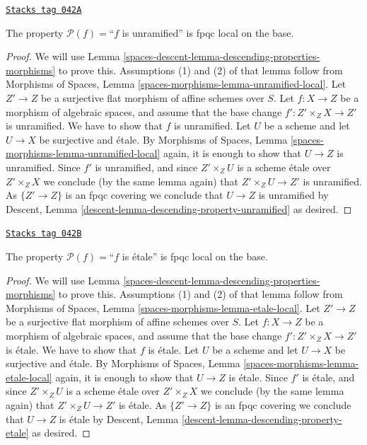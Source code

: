 \begin{lemma}
\label{spaces-descent-lemma-descending-property-unramified}
\href{https://stacks.math.columbia.edu/tag/042A}{\texttt{Stacks tag 042A}}

The property $\mathcal{P}(f) =$``$f$ is unramified''
is fpqc local on the base.
\end{lemma}

\begin{proof}
We will use
Lemma \ref{spaces-descent-lemma-descending-properties-morphisms}
to prove this. Assumptions (1) and (2) of that lemma follow from
Morphisms of Spaces,
Lemma \ref{spaces-morphisms-lemma-unramified-local}.
Let $Z' \to Z$ be a surjective flat morphism of affine schemes over $S$.
Let $f : X \to Z$ be a morphism of algebraic spaces, and assume
that the base change $f' : Z' \times_Z X \to Z'$ is unramified.
We have to show that $f$ is unramified. Let $U$ be a scheme
and let $U \to X$ be surjective and \'etale. By
Morphisms of Spaces,
Lemma \ref{spaces-morphisms-lemma-unramified-local}
again, it is enough to show that $U \to Z$ is unramified.
Since $f'$ is unramified, and since $Z' \times_Z U$ is a
scheme \'etale over $Z' \times_Z X$ we conclude (by the same lemma again) that
$Z' \times_Z U \to Z'$ is unramified.
As $\{Z' \to Z\}$ is an fpqc covering we conclude that
$U \to Z$ is unramified by
Descent, Lemma \ref{descent-lemma-descending-property-unramified}
as desired.
\end{proof}

\begin{lemma}
\label{spaces-descent-lemma-descending-property-etale}
\href{https://stacks.math.columbia.edu/tag/042B}{\texttt{Stacks tag 042B}}

The property $\mathcal{P}(f) =$``$f$ is \'etale''
is fpqc local on the base.
\end{lemma}

\begin{proof}
We will use
Lemma \ref{spaces-descent-lemma-descending-properties-morphisms}
to prove this. Assumptions (1) and (2) of that lemma follow from
Morphisms of Spaces,
Lemma \ref{spaces-morphisms-lemma-etale-local}.
Let $Z' \to Z$ be a surjective flat morphism of affine schemes over $S$.
Let $f : X \to Z$ be a morphism of algebraic spaces, and assume
that the base change $f' : Z' \times_Z X \to Z'$ is \'etale.
We have to show that $f$ is \'etale. Let $U$ be a scheme
and let $U \to X$ be surjective and \'etale. By
Morphisms of Spaces,
Lemma \ref{spaces-morphisms-lemma-etale-local}
again, it is enough to show that $U \to Z$ is \'etale.
Since $f'$ is \'etale, and since $Z' \times_Z U$ is a
scheme \'etale over $Z' \times_Z X$ we conclude (by the same lemma again) that
$Z' \times_Z U \to Z'$ is \'etale.
As $\{Z' \to Z\}$ is an fpqc covering we conclude that
$U \to Z$ is \'etale by
Descent, Lemma \ref{descent-lemma-descending-property-etale}
as desired.
\end{proof}

